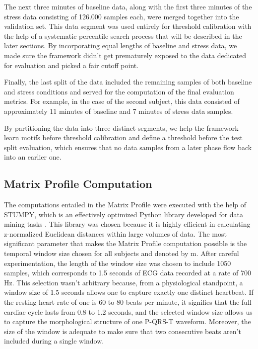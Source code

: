 \documentclass[conference,10pt]{IEEEtran}
\begin{document}
The next three minutes of baseline data, along with the first three minutes of the stress data consisting of 126.000 samples each, were merged together into the validation set. This data segment was used entirely for threshold calibration with the help of a systematic percentile search process that will be described in the later sections. By incorporating equal lengths of baseline and stress data, we made sure the framework didn’t get prematurely exposed to the data dedicated for evaluation and picked a fair cutoff point.

Finally, the last split of the data included the remaining samples of both baseline and stress conditions and served for the computation of the final evaluation metrics. For example, in the case of the second subject, this data consisted of approximately 11 minutes of baseline and 7 minutes of stress data samples. 

By partitioning the data into three distinct segments, we help the framework learn motifs before threshold calibration and define a threshold before the test split evaluation, which ensures that no data samples from a later phase flow back into an earlier one. 


\subsection{Matrix Profile Computation}

The computations entailed in the Matrix Profile were executed with the help of STUMPY, which is an effectively optimized Python library developed for data mining tasks \cite{r18}. This library was chosen because it is highly efficient in calculating z-normalized Euclidean distances within large volumes of data.
The most significant parameter that makes the Matrix Profile computation possible is the temporal window size chosen for all subjects and denoted by m. After careful experimentation, the length of the window size was chosen to include 1050 samples, which corresponds to 1.5 seconds of ECG data recorded at a rate of 700 Hz. This selection wasn’t arbitrary because, from a physiological standpoint, a window size of 1.5 seconds allows one to capture exactly one distinct heartbeat. If the resting heart rate of one is 60 to 80 beats per minute, it signifies that the full cardiac cycle lasts from 0.8 to 1.2 seconds, and the selected window size allows us to capture the morphological structure of one P-QRS-T waveform. Moreover, the size of the window is adequate to make sure that two consecutive beats aren’t included during a single window. 
\end{document}
